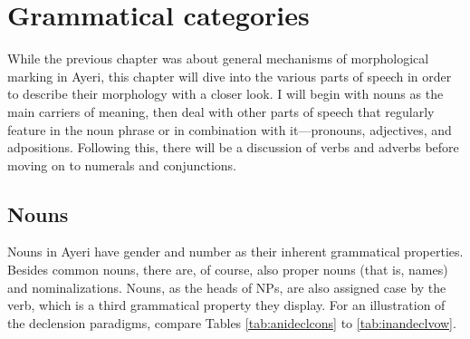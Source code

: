 \chapter{Grammatical categories}
\label{ch:gramcat}

While the previous chapter was about general mechanisms of morphological
marking in Ayeri, this chapter will dive into the various parts of speech in
order to describe their morphology with a closer look. I will begin with nouns
as the main carriers of meaning, then deal with other parts of speech that
regularly feature in the noun phrase or in combination with it---pronouns,
adjectives, and adpositions. Following this, there will be a discussion of
verbs and adverbs before moving on to numerals and conjunctions.

\section{Nouns}
\label{sec:nouns}

Nouns in Ayeri have gender and number as their inherent
grammatical properties. Besides common nouns, there are, of course, also proper
nouns (that is, names) and nominalizations. Nouns, as the heads of NPs, are
also assigned case by the verb, which is a third grammatical property
they display. For an illustration of the declension paradigms, compare Tables
\ref{tab:anideclcons} to \ref{tab:inandeclvow}.

